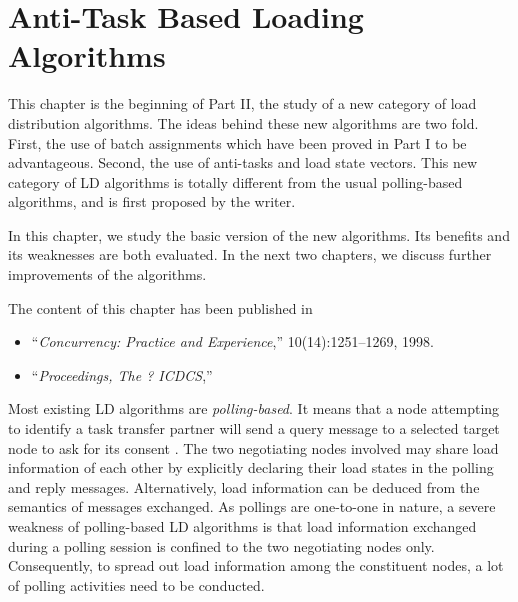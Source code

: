 %


\chapter{Anti-Task Based Loading Algorithms}

{
This chapter is the beginning of Part II, the study of a new
category of load distribution algorithms.
The ideas behind these new algorithms are two fold.
First, the use of batch assignments which have been proved in Part I 
to be advantageous.
Second, the use of anti-tasks and load state vectors.
This new category of LD algorithms is totally different from
the usual polling-based algorithms, and is first proposed by the writer.

In this chapter, we study the basic version of the new algorithms.
Its benefits and its weaknesses are both evaluated.
In the next two chapters, we discuss further improvements of the algorithms.

\small
The content of this chapter has been published in
\begin{itemize}
\item	``{\it Concurrency: Practice and Experience},''
	10(14):1251--1269, 1998.
\item	``{\it Proceedings, The ? ICDCS},''
\end{itemize}
}

Most existing LD algorithms are {\it polling-based\/}.
It means that a node attempting to identify a task transfer partner
will send a query message to a selected target node to ask for its consent
\cite{casavant88,eager86a,eager86b,lu94,lu95b,shiv90,wang85}.
The two negotiating nodes involved may share load information of each other
by explicitly declaring
their load states in the polling and reply messages.
Alternatively, load information can be deduced from the
semantics of messages exchanged.
%
As pollings are one-to-one in nature,
a severe weakness of polling-based LD algorithms is that
load information exchanged during a polling session
is confined to the two negotiating nodes only.
Consequently, to spread out load information among the constituent nodes,
a lot of polling activities need to be conducted.

